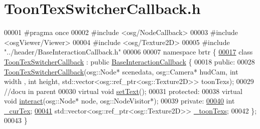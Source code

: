 \hypertarget{_toon_tex_switcher_callback_8h_source}{\section{Toon\+Tex\+Switcher\+Callback.\+h}
\label{_toon_tex_switcher_callback_8h_source}
}

\begin{DoxyCode}
00001 \textcolor{preprocessor}{#pragma once}
00002 \textcolor{preprocessor}{#include <osg/NodeCallback>}
00003 \textcolor{preprocessor}{#include <osgViewer/Viewer>}
00004 \textcolor{preprocessor}{#include <osg/Texture2D>}
00005 \textcolor{preprocessor}{#include "../header/BaseInteractionCallback.h"}
00006 
00007 \textcolor{keyword}{namespace }brtr \{
\hypertarget{_toon_tex_switcher_callback_8h_source_l00017}{}\hyperlink{classbrtr_1_1_toon_tex_switcher_callback}{00017}     \textcolor{keyword}{class }\hyperlink{classbrtr_1_1_toon_tex_switcher_callback}{ToonTexSwitcherCallback} : \textcolor{keyword}{public} 
      \hyperlink{classbrtr_1_1_base_interaction_callback}{BaseInteractionCallback} \{
00018     \textcolor{keyword}{public}:
00028         \hyperlink{classbrtr_1_1_toon_tex_switcher_callback_ae117afe5056c885a625a850e1d0fbae7}{ToonTexSwitcherCallback}(osg::Node* scenedata, osg::Camera* hudCam, \textcolor{keywordtype}{int} width
      , \textcolor{keywordtype}{int} height, std::vector<osg::ref\_ptr<osg::Texture2D>> toonTexs);
00029         \textcolor{comment}{//docu in parent}
00030         \textcolor{keyword}{virtual} \textcolor{keywordtype}{void} \hyperlink{classbrtr_1_1_toon_tex_switcher_callback_aad13301231829b5c28f14910d4d44355}{setText}();
00031     \textcolor{keyword}{protected}:
00038         \textcolor{keyword}{virtual} \textcolor{keywordtype}{void} \hyperlink{classbrtr_1_1_toon_tex_switcher_callback_a97047bc2817ddfecc2c1531d22e289fd}{interact}(osg::Node* node, osg::NodeVisitor*);
00039     \textcolor{keyword}{private}:
\hypertarget{_toon_tex_switcher_callback_8h_source_l00040}{}\hyperlink{classbrtr_1_1_toon_tex_switcher_callback_a58030dcd246f0f2c168965ca087cfa17}{00040}         \textcolor{keywordtype}{int} \hyperlink{classbrtr_1_1_toon_tex_switcher_callback_a58030dcd246f0f2c168965ca087cfa17}{\_curTex};
\hypertarget{_toon_tex_switcher_callback_8h_source_l00041}{}\hyperlink{classbrtr_1_1_toon_tex_switcher_callback_a96cbd2a83f9ed21efde9d086c34e6d5e}{00041}         std::vector<osg::ref\_ptr<osg::Texture2D>> \hyperlink{classbrtr_1_1_toon_tex_switcher_callback_a96cbd2a83f9ed21efde9d086c34e6d5e}{\_toonTexs};
00042     \};
00043 \}
\end{DoxyCode}
